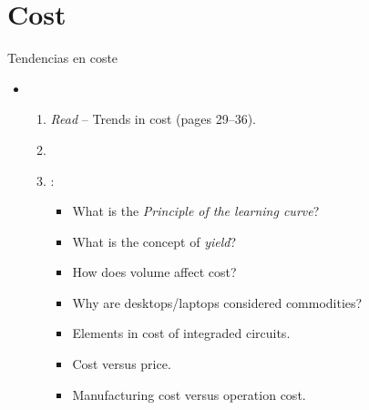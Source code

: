 \section{Cost}

\begin{frame}[t]{Tendencias en coste}
\begin{itemize}
  \item {}
    \begin{enumerate}
      \item \emph{Read}  -- Trends in cost (pages 29--36).
        \item \bibhennessy

      \item {}:
        \begin{itemize}
          \item What is the \emph{Principle of the learning curve}?
          \item What is the concept of \emph{yield}?
          \item How does volume affect cost?
          \item Why are desktops/laptops considered commodities?
          \item Elements in cost of integraded circuits.
          \item Cost versus price.
          \item Manufacturing cost versus operation cost.
        \end{itemize}
    \end{enumerate}
\end{itemize}
\end{frame}
